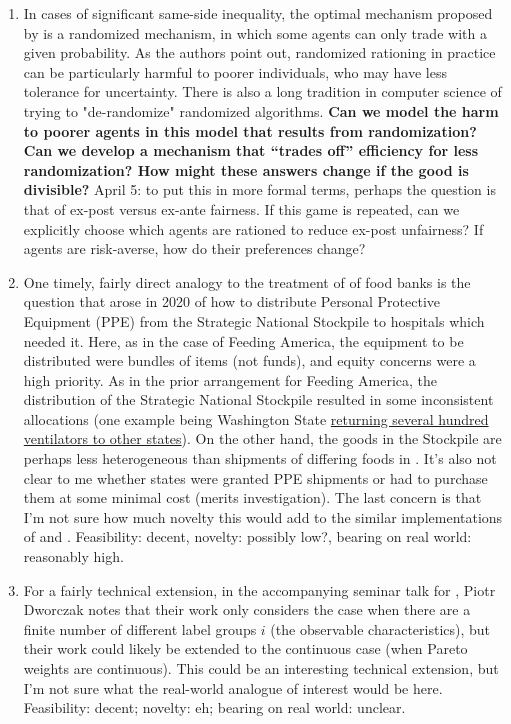 \documentclass[JEL]{AEA}
\begin{document}
\begin{enumerate}
    \item In cases of significant same-side inequality, the optimal mechanism proposed by \cite{dworczak-2020} is a randomized mechanism, in which some agents can only trade with a given probability. As the authors point out, randomized rationing in practice can be particularly harmful to poorer individuals, who may have less tolerance for uncertainty. There is also a long tradition in computer science of trying to "de-randomize" randomized algorithms. \textbf{Can we model the harm to poorer agents in this model that results from randomization? Can we develop a mechanism that ``trades off'' efficiency for less randomization? How might these answers change if the good is divisible?} April 5: to put this in more formal terms, perhaps the question is that of ex-post versus ex-ante fairness. If this game is repeated, can we explicitly choose which agents are rationed to reduce ex-post unfairness? If agents are risk-averse, how do their preferences change?
    
    \item One timely, fairly direct analogy to the treatment of \cite{prendergast-2017} of food banks is the question that arose in 2020 of how to distribute Personal Protective Equipment (PPE) from the Strategic National Stockpile to hospitals which needed it. Here, as in the case of Feeding America, the equipment to be distributed were bundles of items (not funds), and equity concerns were a high priority. As in the prior arrangement for Feeding America, the distribution of the Strategic National Stockpile resulted in some inconsistent allocations (one example being Washington State \href{governor.wa.gov/news-media/we’re-together-–-washington-state-send-ventilators}{returning several hundred ventilators to other states}). On the other hand, the goods in the Stockpile are perhaps less heterogeneous than shipments of differing foods in \cite{prendergast-2017}. It's also not clear to me whether states were granted PPE shipments or had to purchase them at some minimal cost (merits investigation). The last concern is that I'm not sure how much novelty this would add to the similar implementations of \cite{prendergast-2017} and \cite{budish-2011}. Feasibility: decent, novelty: possibly low?, bearing on real world: reasonably high.
    
    \item For a fairly technical extension, in the accompanying seminar talk for \cite{akbarpour-2020}, Piotr Dworczak notes that their work only considers the case when there are a finite number of different label groups $i$ (the observable characteristics), but their work could likely be extended to the continuous case (when Pareto weights are continuous). This could be an interesting technical extension, but I'm not sure what the real-world analogue of interest would be here. Feasibility: decent; novelty: eh; bearing on real world: unclear.
    

\end{enumerate}
\end{document}
